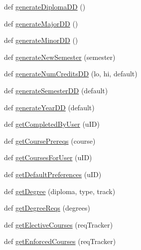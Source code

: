 \begin{DoxyCompactItemize}
\item 
def \mbox{\hyperlink{namespacemavAgenda_1_1landing_1_1views_a105948cc4eeb1f721d86f670a3020470}{generate\+Diploma\+DD}} ()
\item 
def \mbox{\hyperlink{namespacemavAgenda_1_1landing_1_1views_ab60f609329a57c41030685c032249fbb}{generate\+Major\+DD}} ()
\item 
def \mbox{\hyperlink{namespacemavAgenda_1_1landing_1_1views_aeefa9826cec239552cb7620c54e76450}{generate\+Minor\+DD}} ()
\item 
def \mbox{\hyperlink{namespacemavAgenda_1_1landing_1_1views_a3ce0d3f74eb2fd5b10052c2c019478a1}{generate\+New\+Semester}} (semester)
\item 
def \mbox{\hyperlink{namespacemavAgenda_1_1landing_1_1views_a49e86f3d201ca31fde603a8555dac464}{generate\+Num\+Credits\+DD}} (lo, hi, default)
\item 
def \mbox{\hyperlink{namespacemavAgenda_1_1landing_1_1views_a19301baffd56440f07e157f4304bcfa7}{generate\+Semester\+DD}} (default)
\item 
def \mbox{\hyperlink{namespacemavAgenda_1_1landing_1_1views_a6d29704212cb7db9f5a2935dc1b037eb}{generate\+Year\+DD}} (default)
\item 
def \mbox{\hyperlink{namespacemavAgenda_1_1landing_1_1views_a348cf64ede97168dfaacf49cb86396aa}{get\+Completed\+By\+User}} (u\+ID)
\item 
def \mbox{\hyperlink{namespacemavAgenda_1_1landing_1_1views_aea033cb7fd4db6ad8582d9030adbd9eb}{get\+Course\+Prereqs}} (course)
\item 
def \mbox{\hyperlink{namespacemavAgenda_1_1landing_1_1views_acf197252d8fc64ca8dabcd3ad86c44fa}{get\+Courses\+For\+User}} (u\+ID)
\item 
def \mbox{\hyperlink{namespacemavAgenda_1_1landing_1_1views_abf63ccc16307602c6e3cd8cdd0a27439}{get\+Default\+Preferences}} (u\+ID)
\item 
def \mbox{\hyperlink{namespacemavAgenda_1_1landing_1_1views_a092514b579e6413adfe4dcc1ec5f5a81}{get\+Degree}} (diploma, type, track)
\item 
def \mbox{\hyperlink{namespacemavAgenda_1_1landing_1_1views_a744df9b524faa76fa7949ae1bb839cee}{get\+Degree\+Reqs}} (degrees)
\item 
def \mbox{\hyperlink{namespacemavAgenda_1_1landing_1_1views_a093f67040145dbbb211f971ef3afb21c}{get\+Elective\+Courses}} (req\+Tracker)
\item 
def \mbox{\hyperlink{namespacemavAgenda_1_1landing_1_1views_a5e53a5236a02d3bd8bcdd5864a1d5eb5}{get\+Enforced\+Courses}} (req\+Tracker)

\end{DoxyCompactItemize}
